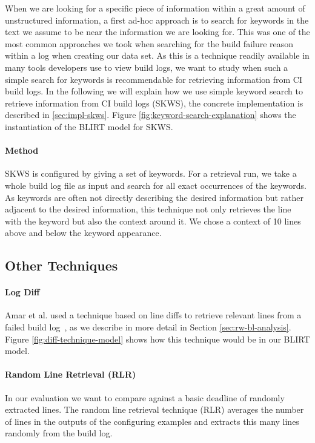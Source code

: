 \documentclass[\myrootdir/main.tex]{subfiles}
\begin{document}
When we are looking for a specific piece of information within a great amount of unstructured information, a first ad-hoc approach is to search for keywords in the text we assume to be near the information we are looking for.
This was one of the most common approaches we took when searching for the build failure reason within a log when creating our data set.
As this is a technique readily available in many tools developers use to view build logs, we want to study when such a simple search for keywords is recommendable for retrieving information from CI build logs.
In the following we will explain how we use simple keyword search to retrieve information from CI build logs (SKWS), the concrete implementation is described in \ref{sec:impl-skws}.
Figure \ref{fig:keyword-search-explanation} shows the instantiation of the BLIRT model for SKWS.

\paragraph{Method}
SKWS is configured by giving a set of keywords.
For a retrieval run, we take a whole build log file as input and search for all exact occurrences of the keywords.
As keywords are often not directly describing the desired information but rather adjacent to the desired information, this technique not only retrieves the line with the keyword but also the context around it.
We chose a context of 10 lines above and below the keyword appearance.


\subsection{Other Techniques}
\label{sec:expl-rlr}

\paragraph{Log Diff}
Amar et al. used a technique based on line diffs to retrieve relevant lines from a failed build log~\cite{amar2019mining}, as we describe in more detail in Section \ref{sec:rw-bl-analysis}.
Figure \ref{fig:diff-technique-model} shows how this technique would be in our BLIRT model.
\paragraph{Random Line Retrieval (RLR)}
In our evaluation we want to compare against a basic deadline of randomly extracted lines.
The random line retrieval technique (RLR) averages the number of lines in the outputs of the configuring examples and extracts this many lines randomly from the build log.
\end{document}
